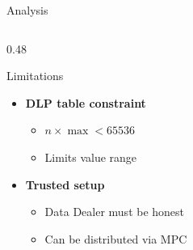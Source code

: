 \documentclass[aspectratio=169,10pt]{beamer}
\begin{document}
\begin{frame}{Analysis}
\begin{columns}[T]
\begin{column}{0.48\textwidth}
\begin{alertblock}{Limitations}
\begin{itemize}
                        \begin{itemize}
                            \item $O(\kappa)$ per user
                            \item Mitigated by parallelization
                        \end{itemize}
                    \item \textbf{DLP table constraint}
                        \begin{itemize}
                            \item $n \times \max < 65536$
                            \item Limits value range
                        \end{itemize}
                    \item \textbf{Trusted setup}
                        \begin{itemize}
                            \item Data Dealer must be honest
                            \item Can be distributed via MPC
                        \end{itemize}
                \end{itemize}
            \end{alertblock}
        \end{column}
    \end{columns}
\end{frame}
\end{document}

